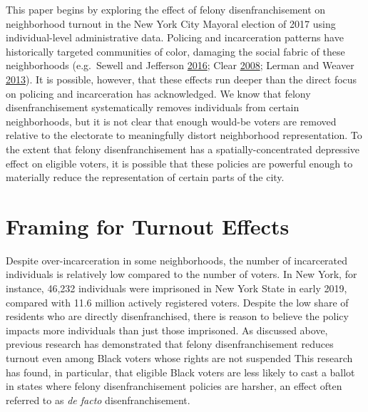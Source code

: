 \documentclass[12pt,]{article}
\begin{document}
This paper begins by exploring the effect of felony disenfranchisement on neighborhood turnout in the New York City Mayoral election of 2017 using individual-level administrative data. Policing and incarceration patterns have historically targeted communities of color, damaging the social fabric of these neighborhoods (e.g.~Sewell and Jefferson \protect\hyperlink{ref-Sewell2016}{2016}; Clear \protect\hyperlink{ref-Clear2008}{2008}; Lerman and Weaver \protect\hyperlink{ref-Lerman2013}{2013}). It is possible, however, that these effects run deeper than the direct focus on policing and incarceration has acknowledged. We know that felony disenfranchisement systematically removes individuals from certain neighborhoods, but it is not clear that enough would-be voters are removed relative to the electorate to meaningfully distort neighborhood representation. To the extent that felony disenfranchisement has a spatially-concentrated depressive effect on eligible voters, it is possible that these policies are powerful enough to materially reduce the representation of certain parts of the city.

\hypertarget{framing-for-turnout-effects}{%
\section*{Framing for Turnout Effects}\label{framing-for-turnout-effects}}

Despite over-incarceration in some neighborhoods, the number of incarcerated individuals is relatively low compared to the number of voters. In New York, for instance, 46,232 individuals were imprisoned in New York State in early 2019, compared with 11.6 million actively registered voters. Despite the low share of residents who are directly disenfranchised, there is reason to believe the policy impacts more individuals than just those imprisoned. As discussed above, previous research has demonstrated that felony disenfranchisement reduces turnout even among Black voters whose rights are not suspended This research has found, in particular, that eligible Black voters are less likely to cast a ballot in states where felony disenfranchisement policies are harsher, an effect often referred to as \emph{de facto} disenfranchisement.
\end{document}
